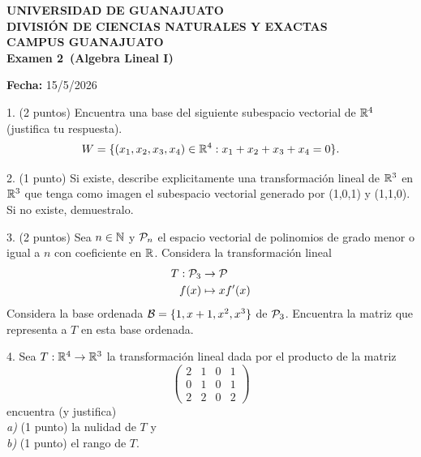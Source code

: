 \documentclass[12pt,a4paper]{article}
\newcommand{\materia}{Algebra Lineal I}
\newcommand{\tarea}{Examen 2}
\newcommand{\fecha}{15/5/2026}
\begin{document}
    \begin{center}
        {\large\textbf{UNIVERSIDAD DE GUANAJUATO}}\\[0.3cm]
        {\normalsize\textbf{DIVISIÓN DE CIENCIAS NATURALES Y EXACTAS}}\\
        {\normalsize\textbf{CAMPUS GUANAJUATO}}\\[1cm]

        {\Large\textbf{\tarea\ (\materia)}}\\[1cm]
    \end{center}

    
    \begin{center}
        \textbf{Fecha:} \fecha 
    \end{center}
    

    \vspace{0.3cm}

    1. (2 puntos) Encuentra una base del siguiente subespacio vectorial de $\mathbb{R}^{4}$
    (justifica tu respuesta).
    \begin{equation*}
        W=\{(x_{1},x_{2},x_{3},x_{4})\in\mathbb{R}^{4}:x_{1}+x_{2}+x_{3}+x_{4}=0\}.
    \end{equation*}

    2. (1 punto) Si existe, describe explicitamente una transformación lineal de $\mathbb{R}^{3}$
    en $\mathbb{R}^{3}$ que tenga como imagen el subespacio vectorial generado por (1,0,1) y
    (1,1,0). Si no existe, demuestralo.

    \vspace{0.5cm}

    3. (2 puntos) Sea $n\in\mathbb{N}$ y $\mathcal{P}_{n}$ el espacio vectorial de polinomios
    de grado menor o igual a $n$ con coeficiente en $\mathbb{R}$. Considera la transformación
    lineal
    \begin{align*}
        T:\mathcal{P}_{3}&\to\mathcal{P}\\
        f(x)&\mapsto xf^{\prime}(x)
    \end{align*}
    Considera la base ordenada $\mathcal{B}=\{1,x+1,x^{2},x^{3}\}$ de $\mathcal{P}_{3}$. Encuentra la matriz
    que representa a $T$ en esta base ordenada.

    \vspace{0.5cm}

    4. Sea $T:\mathbb{R}^{4}\to\mathbb{R}^{3}$ la transformación lineal dada por el producto de la matriz
    \begin{equation*}
        \begin{pmatrix}
            2 & 1 & 0 & 1\\
            0 & 1 & 0 & 1\\
            2 & 2 & 0 & 2
        \end{pmatrix}
    \end{equation*}
    encuentra (y justifica)\\
    \textit{a)} (1 punto) la nulidad de $T$ y\\
    \textit{b)} (1 punto) el rango de $T$.
\end{document}
